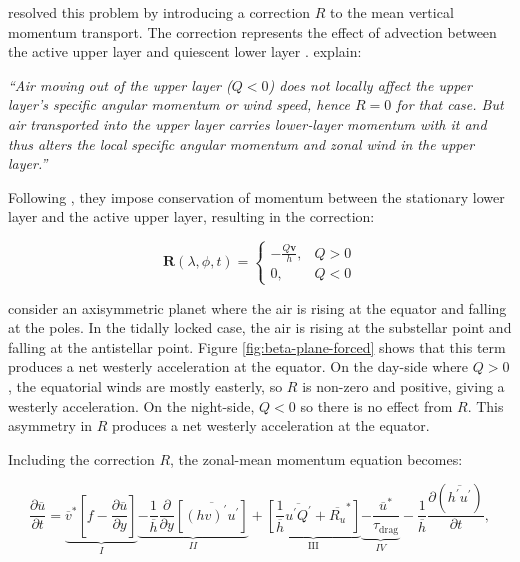 \citet{showman2010superrotation} resolved this problem by introducing a correction $R$ to the mean vertical momentum transport. The correction represents the effect of advection between the active upper layer and quiescent lower layer \citep{shell2004superrotation}. \citet{showman2010superrotation} explain:

\textit{``Air moving out of the upper layer ($Q<0$) does not locally affect the upper layer’s specific angular momentum or wind speed, hence $R=0$ for that case. But air transported into the upper layer carries lower‐layer momentum with it and thus alters the local specific angular momentum and zonal wind in the upper layer.''}

Following \citet{shell2004superrotation}, they impose conservation of momentum between the stationary lower layer and the active upper layer, resulting in the correction:

\begin{equation}
  \mathbf{R}(\lambda, \phi, t)=\left\{\begin{array}{ll}{-\frac{Q \mathbf{v}}{h},} & {Q>0} \\ {0,} & {Q<0}\end{array}\right.
\end{equation}

\citet{shell2004superrotation} consider an axisymmetric planet where the air is rising at the equator and falling at the poles. In the tidally locked case, the air is rising at the substellar point and falling at the antistellar point. Figure \ref{fig:beta-plane-forced} shows that this term produces a net westerly acceleration at the equator. On the day-side where $Q>0$, the equatorial winds are mostly easterly, so $R$ is non-zero and positive, giving a westerly acceleration. On the night-side, $Q<0$ so there is no effect from $R$. This asymmetry in $R$ produces a net westerly acceleration at the equator.

Including the correction $R$, the zonal-mean momentum equation becomes:

\begin{equation}\label{eqn:zonal-mean-mom}
  \frac { \partial \overline { u } } { \partial t } = \underbrace { \overline { v } ^ { * } \left[ f - \frac { \partial \overline { u } } { \partial y } \right] } _ { I } \underbrace { - \frac { 1 } { \overline { h } } \frac { \partial } { \partial y } \left[ \overline { ( h v ) ^ { \prime } u ^ { \prime } } \right] } _ { I I } +\underbrace{\left[\frac{1}{\overline{h}} \overline{u^{\prime} Q^{\prime}}+\overline{R_{u}}^{*}\right]}_{\text { III }} \underbrace { - \frac { \overline { u } ^ { * } } { \tau _ { \mathrm { drag } } } } _ { I V } - \frac { 1 } { \overline { h } } \frac { \partial \left( \overline { h ^ { \prime } u ^ { \prime } } \right) } { \partial t },
\end{equation}

